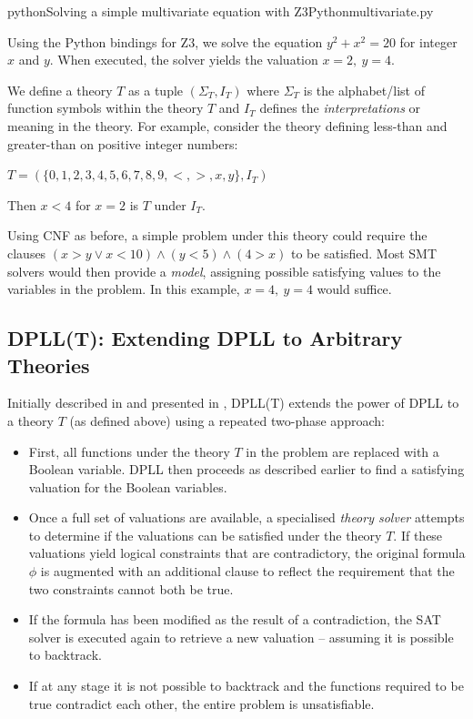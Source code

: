 \documentclass[a4paper,openany,12pt]{book}
\begin{document}
\begin{mycodefile}{python}{\label{code:z3:1}Solving a simple multivariate equation with Z3}{Python}{multivariate.py}

    Using the Python bindings for Z3, we solve the equation $y^2 + x^2 = 20$ for integer $x$ and $y$.
    When executed, the solver yields the valuation $x = 2,~y = 4$.

    \vspace{0.5em}
\end{mycodefile}

We define a theory $T$ as a tuple $(\Sigma_T, I_T)$ where $\Sigma_T$ is the alphabet/list of function symbols within
the theory $T$ and $I_T$ defines the \emph{interpretations} or meaning in the theory.
For example, consider the theory defining less-than and greater-than on positive integer numbers:

\(
T = (\{0,1,2,3,4,5,6,7,8,9,<,>,x,y\}, I_T)
\)

Then $x < 4$ for $x = 2$ is $T$ under $I_T$.

Using CNF as before, a simple problem under this theory could require the clauses $(x > y \lor x < 10) \land (y < 5)
\land (4 > x)$ to be satisfied.
Most SMT solvers would then provide a \emph{model}, assigning possible satisfying values to the variables in the
problem.
In this example, $x = 4,~y=4$ would suffice.


\subsection{DPLL(T): Extending DPLL to Arbitrary Theories}

Initially described in \citet{ganzinger2004dpll} and presented in \citet{russell2016artificial}, DPLL(T) extends the
power of DPLL to a theory $T$ (as defined above) using a repeated two-phase approach:

\begin{itemize}
    \item First, all functions under the theory $T$ in the problem are replaced with a Boolean variable.
          DPLL then proceeds as described earlier to find a satisfying valuation for the Boolean variables.
    \item Once a full set of valuations are available, a specialised \emph{theory solver} attempts to determine if the
          valuations can be satisfied under the theory $T$.
          If these valuations yield logical constraints that are contradictory, the original formula $\phi$ is augmented
          with an additional clause to reflect the requirement that the two constraints cannot both be true.
    \item If the formula has been modified as the result of a contradiction, the SAT solver is executed again to
          retrieve a new valuation -- assuming it is possible to backtrack.
    \item If at any stage it is not possible to backtrack and the functions required to be true contradict each other,
          the entire problem is unsatisfiable.
\end{itemize}
\end{document}
